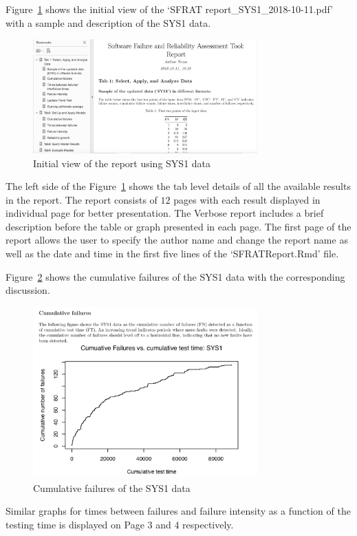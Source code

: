 \documentclass[conference]{IEEEtran}
\begin{document}
Figure~\ref{fig:SYS1Report} shows the initial view of the `SFRAT report\_SYS1\_2018-10-11.pdf' with a sample and description of the SYS1 data.
\begin{figure}[!ht]
\centering
\includegraphics[width=3.4in]{Figures/SYS1Report}
\caption{Initial view of the report using SYS1 data}
\label{fig:SYS1Report}
\end{figure}

\noindent The left side of the Figure~\ref{fig:SYS1Report} shows the tab level details of all the available results in the report. The report consists of $12$ pages with each result displayed in individual page for better presentation. The Verbose report includes a brief description before the table or graph presented in each page. The first page of the report allows the user to specify the author name and change the report name as well as the date and time in the first five lines of the `SFRATReport.Rmd' file.

Figure~\ref{fig:SYS1CumFail} shows the cumulative failures of the SYS1 data with the corresponding discussion. 
\begin{figure}[!ht]
\centering
\includegraphics[width=3.4in]{Figures/SYS1CumFail}
\caption{Cumulative failures of the SYS1 data}
\label{fig:SYS1CumFail}
\end{figure}

\noindent Similar graphs for times between failures and failure intensity as a function of the testing time is displayed on Page 3 and 4 respectively.
\end{document}
